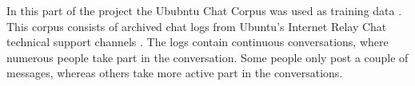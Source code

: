 In this part of the project the Ububntu Chat Corpus was used as training data . This corpus consists of archived chat logs  from Ubuntu's Internet Relay Chat technical support channels . The logs contain continuous conversations, where numerous people take part in the conversation. Some people only post a couple of messages, whereas others take more active part in the conversations. 
